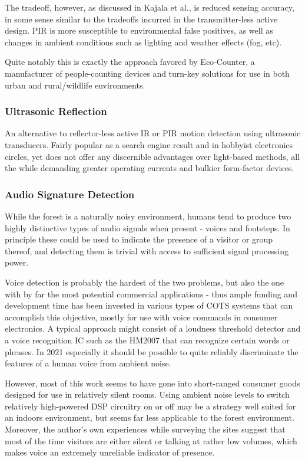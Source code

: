 \documentclass[10pt,nocopyrightspace]{ewsn-proc}
\begin{document}
The tradeoff, however, as discussed in Kajala et al.\cite{Kajala:Baltic}, is reduced sensing accuracy, in some sense similar to the tradeoffs incurred in the transmitter-less active design. PIR is more susceptible to environmental false positives, as well as changes in ambient conditions such as lighting and weather effects (fog, etc).

Quite notably this is exactly the approach favored by Eco-Counter, a manufacturer of people-counting devices and turn-key solutions for use in both urban and rural/wildlife environments.

\subsubsection{Ultrasonic Reflection}
An alternative to reflector-less active IR or PIR motion detection using ultrasonic transducers. Fairly popular as a search engine result and in hobbyist electronics circles, yet does not offer any discernible advantages over light-based methods, all the while demanding greater operating currents and bulkier form-factor devices. 

\subsubsection{Audio Signature Detection}
While the forest is a naturally noisy environment, humans tend to produce two highly distinctive types of audio signals when present - voices and footsteps. In principle these could be used to indicate the presence of a visitor or group thereof, and detecting them is trivial with access to sufficient signal processing power.

Voice detection is probably the hardest of the two problems, but also the one with by far the most potential commercial applications - thus ample funding and development time has been invested in various types of COTS systems that can accomplish this objective, mostly for use with voice commands in consumer electronics. A typical approach might consist of a loudness threshold detector and a voice recognition IC such as the HM2007\cite{HM2007} that can recognize certain words or phrases. In 2021 especially it should be possible to quite reliably discriminate the features of a human voice from ambient noise. 

However, most of this work seems to have gone into short-ranged consumer goods designed for use in relatively silent rooms. Using ambient noise levels to switch relatively high-powered DSP circuitry on or off may be a strategy well suited for an indoors environment, but seems far less applicable to the forest environment. Moreover, the author’s own experiences while surveying the sites suggest that most of the time visitors are either silent or talking at rather low volumes, which makes voice an extremely unreliable indicator of presence.
\end{document}
